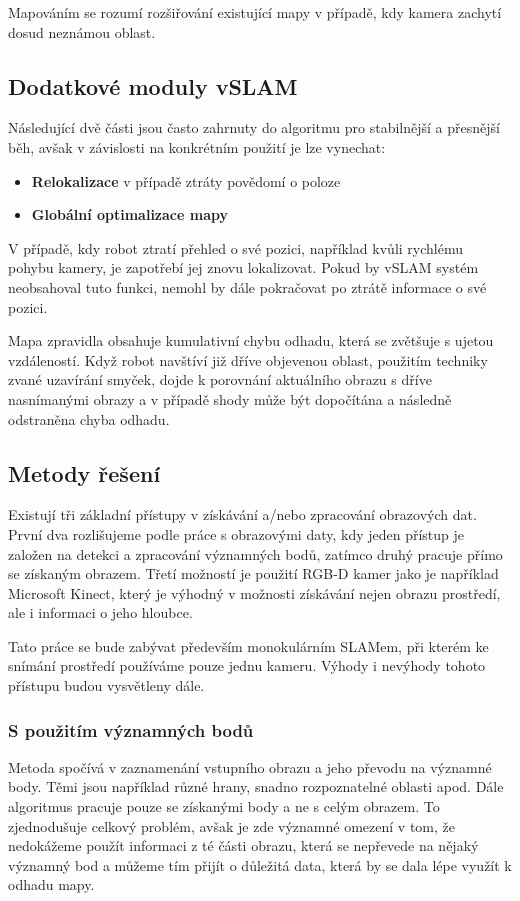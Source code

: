 \documentclass[12pt,a4paper]{article}
\begin{document}
Mapováním se rozumí rozšiřování existující mapy v případě, kdy kamera zachytí dosud neznámou oblast.

\subsection*{Dodatkové moduly vSLAM}
Následující dvě části jsou často zahrnuty do algoritmu pro stabilnější a přesnější běh, avšak v závislosti na konkrétním použití je lze vynechat:
\begin{itemize}
\item \textbf{Relokalizace} v případě ztráty povědomí o poloze
\item \textbf{Globální optimalizace mapy}
\end{itemize}

V případě, kdy robot ztratí přehled o své pozici, například kvůli rychlému pohybu kamery, je zapotřebí jej znovu lokalizovat. Pokud by vSLAM systém neobsahoval tuto funkci, nemohl by dále pokračovat po ztrátě informace o své pozici.

Mapa zpravidla obsahuje kumulativní chybu odhadu, která se zvětšuje s ujetou \linebreak vzdáleností. Když robot navštíví již dříve objevenou oblast, použitím techniky zvané uzavírání smyček, dojde k porovnání aktuálního obrazu s dříve nasnímanými obrazy a v případě shody může být dopočítána a následně odstraněna chyba odhadu.

\subsection{Metody řešení}
Existují tři základní přístupy v získávání a/nebo zpracování obrazových dat. První dva rozlišujeme podle práce s obrazovými daty, kdy jeden přístup je založen na detekci a zpracování významných bodů, zatímco druhý pracuje přímo se získaným obrazem. Třetí možností je použití RGB-D kamer jako je například Microsoft Kinect, který je výhodný v možnosti získávání nejen obrazu prostředí, ale i informaci o jeho hloubce. 

Tato práce se bude zabývat především monokulárním SLAMem, při kterém ke snímání prostředí používáme pouze jednu kameru. Výhody i nevýhody tohoto přístupu budou vysvětleny dále.

\subsubsection{S použitím významných bodů}
Metoda spočívá v zaznamenání vstupního obrazu a jeho převodu na významné body. Těmi jsou například různé hrany, snadno rozpoznatelné oblasti apod. Dále algoritmus pracuje pouze se získanými body a ne s celým obrazem. To zjednodušuje celkový problém, avšak je zde významné omezení v tom, že nedokážeme použít informaci z té části obrazu, která se nepřevede na nějaký významný bod a můžeme tím přijít o důležitá data, která by se dala lépe využít k odhadu mapy.
\end{document}
